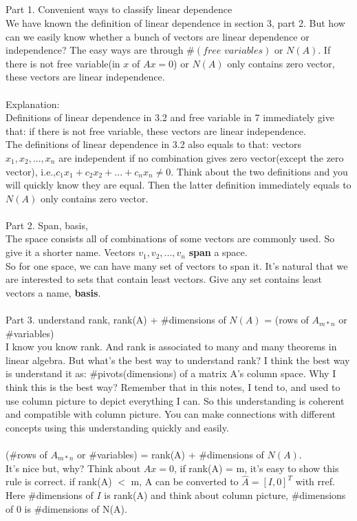 \documentclass{article}
\begin{document}
\begin{spacing}{1.5}
\section{}
Part 1. Convenient ways to classify linear dependence\\
We have known the definition of linear dependence in section 3, part 2. But how can we easily know whether a bunch of vectors are linear dependence or independence? The easy ways are through $\#(free \,\,variables)$ or $N(A)$. If there is not free variable(in $x$ of $Ax=0$) or $N(A)$ only contains zero vector, these vectors are linear independence.\\
\\Explanation:\\
Definitions of linear dependence in 3.2 and free variable in 7 immediately give that: if there is not free variable, these vectors are linear independence. \\
The definitions of linear dependence in 3.2 also equals to that: vectors $x_1, x_2, ..., x_n$ are independent if no combination gives zero vector(except the zero vector), i.e.,$c_1x_1 + c_2x_2+...+c_nx_n \neq 0$. Think about the two definitions and you will quickly know they are equal. Then the latter definition immediately equals to $N(A)$ only contains zero vector.\\
\\Part 2. Span, basis, \\
The space consists all of combinations of some vectors are commonly used. So give it a shorter name. Vectors $v_1, v_2, ..., v_n$ {\bfseries span} a space. \\
So for one space, we can have many set of vectors to span it. It's natural that we are interested to sets that contain least vectors. Give any set contains least vectors a name, {\bfseries basis}.\\
\\Part 3. understand rank, rank(A) + $\#$dimensions of $N(A)$ =  (rows of $A_{m*n}$ or $\#$variables)\\
I know you know rank. And rank is associated to many and many theorems in linear algebra. But what's the best way to understand rank? I think the best way is understand it as: $\#$pivots(dimensions) of a matrix A's column space. Why I think this is the best way? Remember that in this notes, I tend to, and used to use column picture to depict everything I can. So this understanding is coherent and compatible with column picture. You can make connections with different concepts using this understanding quickly and easily. \\
\\(\#rows of $A_{m*n}$ or \#variables) = rank(A) + \#dimensions of $N(A)$. \\
It's nice but, why? Think about $Ax=0$, if rank(A) = m, it's easy to show this rule is correct. if rank(A) $<$ m, A can be converted to $\hat A=[I,0]^T$ with rref. Here \#dimensions of $I$ is rank(A) and think about column picture, \#dimensions of 0 is \#dimensions of N(A).



\end{spacing}
\end{document}
